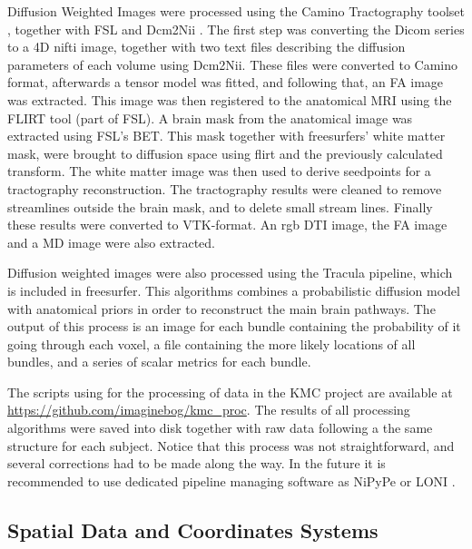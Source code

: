 Diffusion Weighted Images were processed using the Camino Tractography toolset \autocite{cook_camino:_2006}, together with FSL \autocite{jenkinson_fsl_2012} and Dcm2Nii \autocite{rorden_mricron_2007}. The first step was converting the Dicom series to a 4D nifti image, together with two text files describing the diffusion parameters of each volume using Dcm2Nii. These files were converted to Camino format, afterwards a tensor model was fitted, and  following that, an FA image was extracted. This image was then registered to the anatomical MRI using the FLIRT tool (part of FSL). A brain mask from the anatomical image was extracted using FSL's BET. This mask together with freesurfers' white matter mask, were brought to diffusion space using flirt and the previously calculated transform. The white matter image was then used to derive seedpoints for a tractography reconstruction. The tractography results were cleaned to remove streamlines outside the brain mask, and to delete small stream lines. Finally these results were converted to VTK-format. An rgb DTI image, the FA image and a MD image were also extracted.

Diffusion weighted images were also processed using the Tracula \autocite{yendiki_fully_2009} pipeline, which is included in freesurfer. This algorithms combines a probabilistic diffusion model with anatomical priors in order to reconstruct the main brain pathways. The output of this process is an image for each bundle containing the probability of it going through each voxel, a file containing the more likely locations of all bundles, and a series of scalar metrics for each bundle.

The scripts using for the processing of data in the KMC project are available at \url{https://github.com/imaginebog/kmc_proc}. The results of all processing algorithms were saved into disk together with raw data following a the same structure for each subject. Notice that this process was not straightforward, and several corrections had to be made along the way. In the future it is recommended to use dedicated pipeline managing software as NiPyPe \autocite{gorgolewski_nipype:_2011} or LONI \autocite{dinov_efficient_2009}.



\subsection{Spatial Data and Coordinates Systems}

